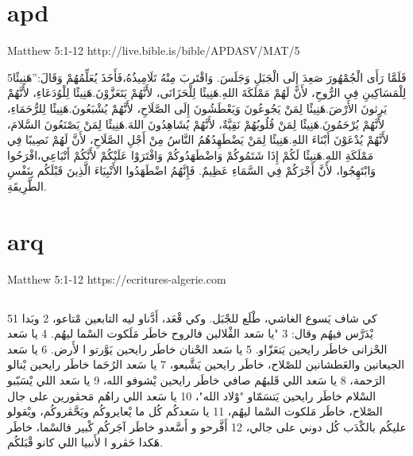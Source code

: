 \documentclass[12pt,fleqn,titlepage,twoside,a4paper]{book}
\begin{document}
\section{apd}

Matthew 5:1-12 http://live.bible.is/bible/APDASV/MAT/5

\begin{arab}[utf]


5فَلَمَّا رَأَى الْجُمْهُورَ صَعِدَ إِلَى الْجَبَلِ وَجَلَسَ. وَاقْتَربَ مِنْهُ تَلَامِيذُهُ،فَأَخَذَ يُعَلِّمُهُمْ وَقَالَ:”هَنِيئًا لِلْمَسَاكِينِ فِي الرُّوحِ، لأَنَّ لَهُمْ مَمْلَكَةَ اللهِ.هَنِيئًا لِلْحَزَانَى، لأَنَّهُمْ يَتَعَزَّوْنَ.هَنِيئًا لِلْوُدَعَاءِ، لأَنَّهُمْ يَرِثونَ الأَرْضَ.هَنِيئًا لِمَنْ يَجُوعُونَ وَيَعْطَشُونَ إِلَى الصَّلَاحِ، لأَنَّهُمْ يُشْبَعُونَ.هَنِيئًا لِلرُّحَمَاءِ، لأَنَّهُمْ يُرْحَمُونَ.هَنِيئًا لِمَنْ قُلُوبُهُمْ نَقِيَّةٌ، لأَنَّهُمْ يُشَاهِدُونَ اللهَ.هَنِيئًا لِمَنْ يَصْنَعُونَ السَّلامَ، لأَنَّهُمْ يُدْعَوْنَ أَبْنَاءَ اللهِ.هَنِيئًا لِمَنْ يَضْطَهِدُهُمُ النَّاسُ مِنْ أَجْلِ الصَّلَاحِ، لأَنَّ لَهُمْ نَصِيبًا فِي مَمْلَكَةِ اللهِ.هَنِيئًا لَكُمْ إِذَا شَتَمُوكُمْ وَاضْطَهَدُوكُمْ وَافْتَرَوْا عَلَيْكُمْ لأَنَّكُمْ أَتْبَاعِي،افْرَحُوا وَابْتَهِجُوا، لأَنَّ أَجْرَكُمْ فِي السَّمَاءِ عَظِيمٌ. فَإِنَّهُمُ اضْطَهَدُوا الأَنْبِيَاءَ الَّذِينَ قَبْلَكُم بِنَفْسِ الطَّرِيقَةِ.
\end{arab}

\section{arq}

Matthew 5:1-12 https://ecritures-algerie.com

\begin{arab}[utf]
\section*{}


51 كي شاف يَسوع الغاشي، طْلَع للجْبَل. وكي قْعَد، أَدَّناو ليه التابعين مْتاعو، 2 وبَدا يْدَرَّس فيهُم وقال: 3 "يا سَعد الڤْلالين فالروح خاطَر
مَلَكوت السْما ليهُم. 4 يا سَعد الحْزانى خاطَر رايحين يَتعَزّاو. 5 يا سَعد الحْنان خاطَر رايحين يَوَّرتو ا لأَرض. 6 يا سَعد الجيعانين
والعَطشانين للصْلاح، خاطَر رايحين يَشَّبعو، 7 يا سَعد الرُحَما خاطَر رايحين يْنالو الرَحمة، 8 يا سَعد اللي قَلبهُم صافي خاطَر رايحين يْشوفو الله،
9 يا سَعد اللي يْسَبّبو السْلام خاطَر رايحين يَتسَمّاو "وْلاد الله"، 10 يا سَعد اللي راهُم مَحڤورين على جال الصْلاح، خاطَر مَلكوت السْما ليهُم، 11 يا
سَعدكُم كُل ما يْعايروكُم ويَحَّڤروكُم، ويْقولو عليكُم بالكْدَب كُل دوني على جالي، 12 أَفَّرحو و أَسَّعدو خاطَر آجَركُم كْبير فالسْما، خاطَر هَكدا حَڤرو
ا لأَنبيا اللي كانو قْبَلكُم.
\end{arab}
\end{document}
